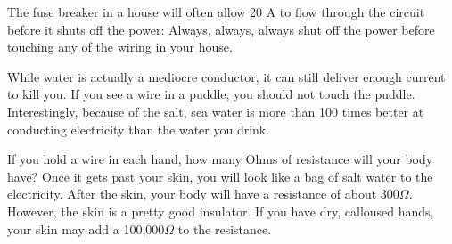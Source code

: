 The fuse breaker in a house will often allow 20 A to flow through the
circuit before it shuts off the power: Always, always, always shut off
the power before touching any of the wiring in your house.

While water is actually a mediocre conductor, it can still deliver enough current
to kill you. If you see a wire in a puddle, you should not touch the
puddle. Interestingly, because of the salt, sea water is more than
100 times better at conducting electricity than the water you drink.


If you hold a wire in each hand, how many Ohms of resistance will your
body have? Once it gets past your skin, you will look like a bag of
salt water to the electricity. After the skin, your body will have a
resistance of about 300$\Omega$. However, the skin is a pretty good
insulator. If you have dry, calloused hands, your skin may add a
100,000$\Omega$ to the resistance.


